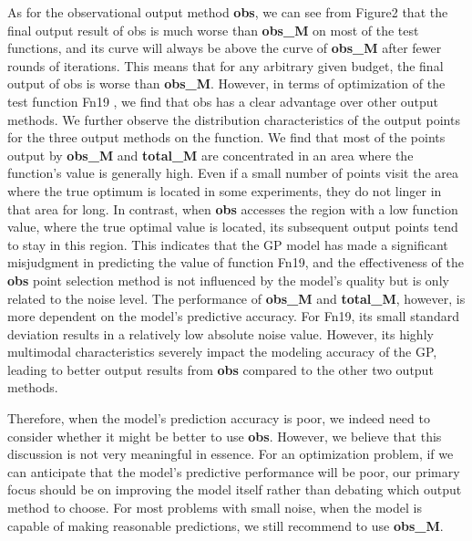 \documentclass{article}
\begin{document}
\hspace{2em}As for the observational output method \textbf{obs}, we can see from Figure2 that the final output result of obs is much worse than \textbf{obs\_M} on most of the test functions, and its curve will always be above the curve of \textbf{obs\_M} after fewer rounds of iterations. This means that for any arbitrary given budget, the final output of obs is worse than \textbf{obs\_M}. However, in terms of optimization of the test function Fn19 , we find that obs has a clear advantage over other output methods. We further observe the distribution characteristics of the output points for the three output methods on the function. We find that most of the points output by \textbf{obs\_M} and \textbf{total\_M} are concentrated in an area where the function's value is generally high. Even if a small number of points visit the area where the true optimum is located in some experiments, they do not linger in that area for long. In contrast, when \textbf{obs} accesses the region with a low function value, where the true optimal value is located, its subsequent output points tend to stay in this region. This indicates that the GP model has made a significant misjudgment in predicting the value of function Fn19, and the effectiveness of the \textbf{obs} point selection method is not influenced by the model's quality but is only related to the noise level. The performance of \textbf{obs\_M} and \textbf{total\_M}, however, is more dependent on the model's predictive accuracy. For Fn19, its small standard deviation results in a relatively low absolute noise value. However, its highly multimodal characteristics severely impact the modeling accuracy of the GP, leading to better output results from \textbf{obs} compared to the other two output methods.

\hspace{2em}Therefore, when the model's prediction accuracy is poor, we indeed need to consider whether it might be better to use \textbf{obs}. However, we believe that this discussion is not very meaningful in essence. For an optimization problem, if we can anticipate that the model's predictive performance will be poor, our primary focus should be on improving the model itself rather than debating which output method to choose. For most problems with small noise, when the model is capable of making reasonable predictions, we still recommend to use \textbf{obs\_M}.
\end{document}

